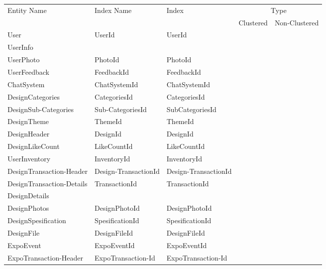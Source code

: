 	\begin{longtable}{| p{3.0cm} | p{2.8cm} | p{3.0cm} | c | c |}
		\hline
		Entity Name 				& Index Name 			& Index 				& \multicolumn{2}{c|}{Type} \\ \cline{4-5}
									& 						&		 				& Clustered 	& Non-Clustered	\\ \hline
		User						& UserId				& UserId				& \checkmark 	& 				\\	\hline
		UserInfo					& 						&						&				& \checkmark	\\ \hline
		UserPhoto					& PhotoId				& PhotoId				& \checkmark	&				\\ \hline
		UserFeedback				& FeedbackId			& FeedbackId			& \checkmark	&				\\ \hline
		ChatSystem					& ChatSystemId			& ChatSystemId			& \checkmark	&				\\ \hline
		DesignCategories 			& CategoriesId			& CategoriesId			& \checkmark	&				\\ \hline
		DesignSub-Categories			& Sub-CategoriesId		& SubCategoriesId		& \checkmark	& 				\\ \hline
		DesignTheme					& ThemeId				& ThemeId				& \checkmark	&				\\ \hline
		DesignHeader				& DesignId				& DesignId				& \checkmark	&				\\ \hline
		DesignLikeCount				& LikeCountId			& LikeCountId			& \checkmark	& 				\\ \hline
		UserInventory				& InventoryId			& InventoryId			& \checkmark	&				\\ \hline
		DesignTransaction-Header		& Design-TransactionId	& Design-TransactionId	& \checkmark	& 				\\ \hline
		DesignTransaction-Details	& TransactionId			& TransactionId			& \checkmark	&				\\ \hline
		DesignDetails				&						&						&				& \checkmark	\\ \hline
		DesignPhotos				& DesignPhotoId			& DesignPhotoId			& \checkmark	&				\\ \hline
		DesignSpesification			& SpesificationId		& SpesificationId		& \checkmark	&				\\ \hline
		DesignFile					& DesignFileId			& DesignFileId			& \checkmark	&				\\ \hline
		ExpoEvent					& ExpoEventId			& ExpoEventId			& \checkmark	&				\\ \hline
		ExpoTransaction-Header		& ExpoTransaction-Id		& ExpoTransaction-Id		& \checkmark	&				\\ \hline

\end{longtable}
